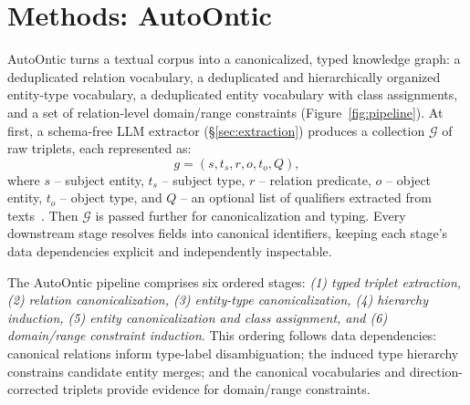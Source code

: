 \documentclass[11pt]{article}
\begin{document}
\section{Methods: AutoOntic}
\label{sec:methods}


AutoOntic turns a textual corpus into a canonicalized, typed knowledge graph: a deduplicated relation vocabulary, a deduplicated and hierarchically organized entity-type vocabulary, a deduplicated entity vocabulary with class assignments, and a set of relation-level domain/range constraints (Figure~\ref{fig:pipeline}).
At first, a schema-free LLM extractor  (\S\ref{sec:extraction}) produces a collection $\mathcal{G}$ of raw triplets,
each represented as:
\begin{equation}
g = (s, t_s, r, o, t_o, Q),
\end{equation}
where $s$ -- subject entity, $t_s$ -- subject type, $r$ -- relation predicate, $o$ -- object entity, $t_o$ -- object type, and $Q$ -- an optional list of qualifiers extracted from texts~\citep{chepurova2026wikontic}. Then $\mathcal{G}$ is passed further for canonicalization and typing. Every downstream stage resolves fields into canonical identifiers, keeping each stage's data dependencies explicit and independently inspectable.


The AutoOntic pipeline comprises six ordered stages:
\emph{(1) typed triplet extraction, (2) relation canonicalization,
(3) entity-type canonicalization, (4) hierarchy induction,
(5) entity canonicalization and class assignment, and
(6) domain/range constraint induction}.
This ordering follows data dependencies: canonical relations inform
type-label disambiguation; the induced type hierarchy constrains
candidate entity merges; and the canonical vocabularies and
direction-corrected triplets provide evidence for domain/range constraints.
\end{document}
